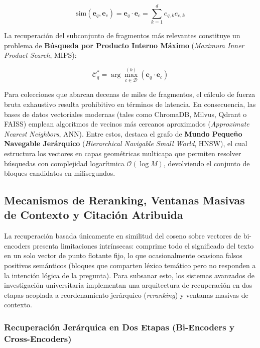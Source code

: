 \begin{equation}
\mathrm{sim}(\mathbf{e}_q, \mathbf{e}_c) = \mathbf{e}_q \cdot \mathbf{e}_c = \sum_{k=1}^d e_{q,k} e_{c,k}
\end{equation}

La recuperación del subconjunto de fragmentos más relevantes constituye un problema de \textbf{Búsqueda por Producto Interno Máximo} (\textit{Maximum Inner Product Search}, MIPS):

\begin{equation}
\mathcal{C}_q^* = \arg\max_{c \in \mathcal{D}}^{(k)} \left( \mathbf{e}_q \cdot \mathbf{e}_c \right)
\end{equation}

Para colecciones que abarcan decenas de miles de fragmentos, el cálculo de fuerza bruta exhaustivo resulta prohibitivo en términos de latencia. En consecuencia, las bases de datos vectoriales modernas (tales como ChromaDB, Milvus, Qdrant o FAISS) emplean algoritmos de vecinos más cercanos aproximados (\textit{Approximate Nearest Neighbors}, ANN). Entre estos, destaca el grafo de \textbf{Mundo Pequeño Navegable Jerárquico} (\textit{Hierarchical Navigable Small World}, HNSW), el cual estructura los vectores en capas geométricas multicapa que permiten resolver búsquedas con complejidad logarítmica $\mathcal{O}(\log M)$, devolviendo el conjunto de bloques candidatos en milisegundos.

\vspace{0.4cm}

\subsection{Mecanismos de Reranking, Ventanas Masivas de Contexto y Citación Atribuida}

La recuperación basada únicamente en similitud del coseno sobre vectores de bi-encoders presenta limitaciones intrínsecas: comprime todo el significado del texto en un solo vector de punto flotante fijo, lo que ocasionalmente ocasiona falsos positivos semánticos (bloques que comparten léxico temático pero no responden a la intención lógica de la pregunta). Para subsanar esto, los sistemas avanzados de investigación universitaria implementan una arquitectura de recuperación en dos etapas acoplada a reordenamiento jerárquico (\textit{reranking}) y ventanas masivas de contexto.

\subsubsection{Recuperación Jerárquica en Dos Etapas (Bi-Encoders y Cross-Encoders)}

